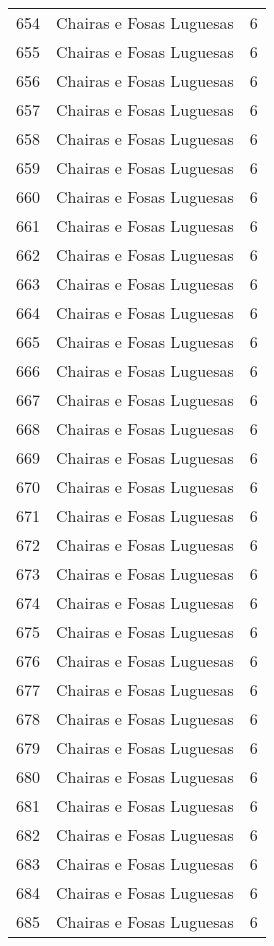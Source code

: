 \begin{table}[p]
\begin{tabular}{rlr}
  654 & Chairas e Fosas Luguesas &   6 \\ 
  655 & Chairas e Fosas Luguesas &   6 \\ 
  656 & Chairas e Fosas Luguesas &   6 \\ 
  657 & Chairas e Fosas Luguesas &   6 \\ 
  658 & Chairas e Fosas Luguesas &   6 \\ 
  659 & Chairas e Fosas Luguesas &   6 \\ 
  660 & Chairas e Fosas Luguesas &   6 \\ 
  661 & Chairas e Fosas Luguesas &   6 \\ 
  662 & Chairas e Fosas Luguesas &   6 \\ 
  663 & Chairas e Fosas Luguesas &   6 \\ 
  664 & Chairas e Fosas Luguesas &   6 \\ 
  665 & Chairas e Fosas Luguesas &   6 \\ 
  666 & Chairas e Fosas Luguesas &   6 \\ 
  667 & Chairas e Fosas Luguesas &   6 \\ 
  668 & Chairas e Fosas Luguesas &   6 \\ 
  669 & Chairas e Fosas Luguesas &   6 \\ 
  670 & Chairas e Fosas Luguesas &   6 \\ 
  671 & Chairas e Fosas Luguesas &   6 \\ 
  672 & Chairas e Fosas Luguesas &   6 \\ 
  673 & Chairas e Fosas Luguesas &   6 \\ 
  674 & Chairas e Fosas Luguesas &   6 \\ 
  675 & Chairas e Fosas Luguesas &   6 \\ 
  676 & Chairas e Fosas Luguesas &   6 \\ 
  677 & Chairas e Fosas Luguesas &   6 \\ 
  678 & Chairas e Fosas Luguesas &   6 \\ 
  679 & Chairas e Fosas Luguesas &   6 \\ 
  680 & Chairas e Fosas Luguesas &   6 \\ 
  681 & Chairas e Fosas Luguesas &   6 \\ 
  682 & Chairas e Fosas Luguesas &   6 \\ 
  683 & Chairas e Fosas Luguesas &   6 \\ 
  684 & Chairas e Fosas Luguesas &   6 \\ 
  685 & Chairas e Fosas Luguesas &   6 \\ 

\end{tabular}
\end{table}
